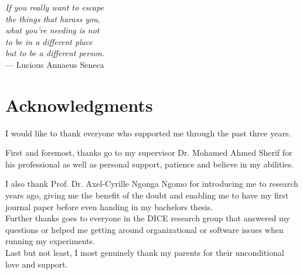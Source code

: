 
\begin{flushright}{\slshape
If you really want to escape \\
the things that harass you, \\
what you’re needing is not \\
to be in a different place\\
but to be a different person.} \\ \medskip
    --- Lucious Annaeus Seneca \end{flushright}
\bigskip

\begingroup
\let\clearpage\relax
\let\cleardoublepage\relax
\let\cleardoublepage\relax
\chapter*{Acknowledgments}
I would like to thank everyone who supported me through the past three years.

First and foremost, thanks go to my supervisor Dr. Mohamed Ahmed Sherif for his professional as well as personal support, patience and believe in my abilities.

I also thank Prof. Dr. Axel-Cyrille Ngonga Ngomo for introducing me to research years ago, giving me the benefit of the doubt and enabling me to have my first journal paper before even handing in my bachelors thesis.\\

Further thanks goes to everyone in the DICE research group that answered my questions or helped me getting around organizational or software issues when running my experiments.\\

Last but not least, I most genuinely thank my parents for their unconditional love and support.
\endgroup

